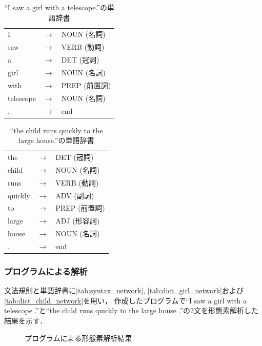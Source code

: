 \documentclass[uplatex, dvipdfmx, a4paper, twocolumn]{jsarticle}
\begin{document}
      \begin{table}[htb]
        \centering
        \caption{``I saw a girl with a telescope.''の単語辞書}
        \label{tab:dict_girl_network}
        \begin{tabular}{l c l} \hline
          I & $\to$ & NOUN (名詞) \\
          saw & $\to$ & VERB (動詞) \\
          a & $\to$ & DET (冠詞) \\
          girl & $\to$ & NOUN (名詞) \\
          with & $\to$ & PREP (前置詞) \\
          telescope & $\to$ & NOUN (名詞) \\
          . & $\to$ & end \\ \hline
        \end{tabular}
      \end{table}
      \begin{table}[htb]
        \centering
        \caption{``the child runs quickly to the large house.''の単語辞書}
        \label{tab:dict_child_network}
        \begin{tabular}{l c l} \hline
          the & $\to$ & DET (冠詞) \\
          child & $\to$ & NOUN (名詞) \\
          runs & $\to$ & VERB (動詞) \\
          quickly & $\to$ & ADV (副詞) \\
          to & $\to$ & PREP (前置詞) \\
          large & $\to$ & ADJ (形容詞) \\
          house & $\to$ & NOUN (名詞) \\
          . & $\to$ & end \\ \hline
        \end{tabular}
      \end{table}

      \subsubsection{プログラムによる解析}
      文法規則と単語辞書に\autoref{tab:syntax_network}, \autoref{tab:dict_girl_network}および\autoref{tab:dict_child_network}を用い，
      作成したプログラムで``I saw a girl with a telescope .''と``the child runs quickly to the large house .''の2文を形態素解析した結果を示す．
      \begin{figure}[htpb]
        \centering
        \caption{プログラムによる形態素解析結果}
        \label{fig:result_network}
      \end{figure}
\end{document}
